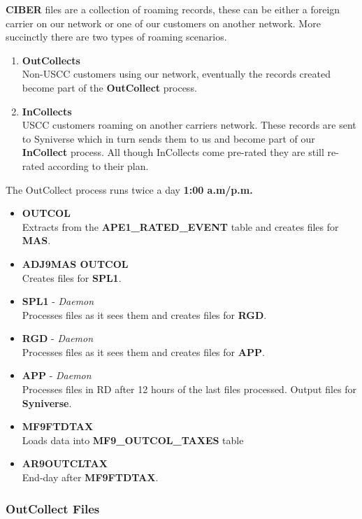 \documentclass[12pt,twoside]{article}
\begin{document}
  \textbf{CIBER} files are a collection of roaming records, these can be
  either a foreign carrier on our network or one of our customers
  on another network. More succinctly there are two
  types of roaming scenarios.
\begin{enumerate}
\item \textbf{OutCollects}\\ Non-USCC customers using our network, eventually
       the records created become part of the \textbf{OutCollect} process.
\item \textbf{InCollects}\\ USCC customers roaming on another carriers
       network. These records are sent to Syniverse which in turn
       sends them to us and become part of our \textbf{InCollect} process. All though InCollects come pre-rated they are still re-rated according to their plan.
\end{enumerate}

   The OutCollect process runs twice a day \textbf{1:00 a.m/p.m.}
\begin{itemize}
\item \textbf{OUTCOL} \\ Extracts from the \textbf{APE1\_RATED\_EVENT} table and creates files for \textbf{MAS}.
\item \textbf{ADJ9MAS OUTCOL}\\ Creates files for \textbf{SPL1}.
\item \textbf{SPL1} - \emph{Daemon}\\ Processes files as it sees them and creates files for \textbf{RGD}.
\item \textbf{RGD} - \emph{Daemon}\\ Processes files as it sees them and creates files for \textbf{APP}.
\item \textbf{APP} - \emph{Daemon}\\ Processes files in RD after 12 hours of the last files processed. Output files for \textbf{Syniverse}.
\item \textbf{MF9FTDTAX}\\ Loads data into \textbf{MF9\_OUTCOL\_TAXES} table
\item \textbf{AR9OUTCLTAX}\\ End-day after \textbf{MF9FTDTAX}.
\end{itemize}
\subsubsection{OutCollect Files}
\label{sec-3-7-1}
\end{document}
